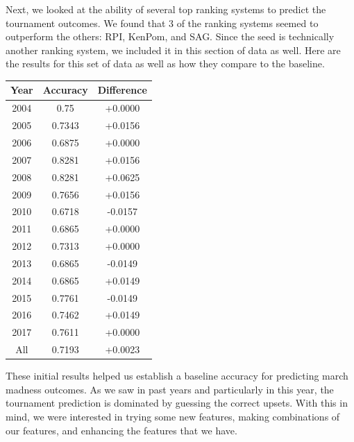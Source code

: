 Next, we looked at the ability of several top ranking systems to predict the tournament outcomes.
We found that 3 of the ranking systems seemed to outperform the others: RPI, KenPom, and SAG.
Since the seed is technically another ranking system, we included it in this section of data as well.
Here are the results for this set of data as well as how they compare to the baseline.

\vspace{0.5cm}
\begin{tabular}{c c c}
    \toprule
    Year & Accuracy & Difference\\
    \midrule
    2004 & 0.75 & +0.0000\\
    2005 & 0.7343 & +0.0156\\
    2006 & 0.6875 & +0.0000\\
    2007 & 0.8281 & +0.0156\\
    2008 & 0.8281 & +0.0625\\
    2009 & 0.7656 & +0.0156\\
    2010 & 0.6718 & -0.0157\\
    2011 & 0.6865 & +0.0000\\
    2012 & 0.7313 & +0.0000\\
    2013 & 0.6865 & -0.0149\\
    2014 & 0.6865 & +0.0149\\
    2015 & 0.7761 & -0.0149\\
    2016 & 0.7462 & +0.0149\\
    2017 & 0.7611 & +0.0000\\
    All & 0.7193 & +0.0023\\
    \bottomrule
  \end{tabular}
  \vspace{0.5cm}

These initial results helped us establish a baseline accuracy for predicting march madness outcomes.
As we saw in past years and particularly in this year, the tournament prediction is dominated by guessing the correct upsets.
With this in mind, we were interested in trying some new features, making combinations of our features, and enhancing the features that we have.
